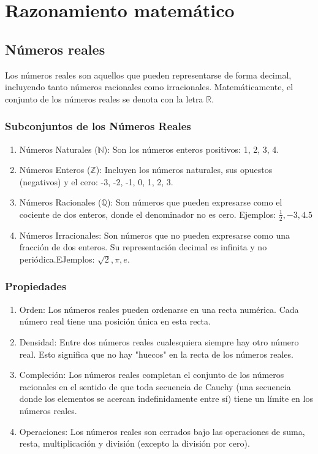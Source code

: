 \section{Razonamiento matemático}
\subsection{Números reales}

Los números reales son aquellos que pueden representarse de forma decimal, incluyendo tanto números racionales como irracionales. Matemáticamente, el conjunto de los números reales se denota con la letra
$\mathbb{R}$.

\subsubsection{Subconjuntos de los Números Reales}

\begin{enumerate}
	\item Números Naturales ($\mathbb{N}$): Son los números enteros positivos: 1, 2, 3, 4.
	\item Números Enteros ($\mathbb{Z}$): Incluyen los números naturales, sus opuestos (negativos) y el cero: -3, -2, -1, 0, 1, 2, 3.
	\item Números Racionales ($\mathbb{Q}$): Son números que pueden expresarse como el cociente de dos enteros, donde el denominador no es cero. Ejemplos: $\frac{1}{2}, -3, 4.5$
	\item Números Irracionales: Son números que no pueden expresarse como una fracción de dos enteros. Su representación decimal es infinita y no periódica.EJemplos: $\sqrt{2}, \pi, e$.
\end{enumerate}

\subsubsection{Propiedades}
\begin{enumerate}
	\item Orden: Los números reales pueden ordenarse en una recta numérica. Cada número real tiene una posición única en esta recta.
	\item Densidad: Entre dos números reales cualesquiera siempre hay otro número real. Esto significa que no hay "huecos" en la recta de los números reales.
	\item Compleción: Los números reales completan el conjunto de los números racionales en el sentido de que toda secuencia de Cauchy (una secuencia donde los elementos se acercan indefinidamente entre sí) tiene un límite en los números reales.
	\item Operaciones: Los números reales son cerrados bajo las operaciones de suma, resta, multiplicación y división (excepto la división por cero).
\end{enumerate}

